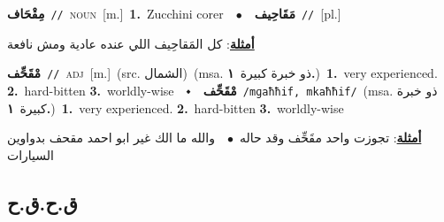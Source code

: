\documentclass[10pt,a4paper,twoside]{article} %
\begin{document}
\begin{multicols}{2}
{\setlength\topsep{0pt}\textbf{\foreignlanguage{arabic}{مِقْحَاف}}\ {\color{gray}\texttt{//}\color{black}}\ \textsc{noun}\ [m.]\ \textbf{1.}~Zucchini corer\ \ $\bullet$\ \ \setlength\topsep{0pt}\textbf{\foreignlanguage{arabic}{مَقَاحِيف}}\ {\color{gray}\texttt{//}\color{black}}\ [pl.]\  \begin{flushright}\color{gray}\foreignlanguage{arabic}{\textbf{\underline{\foreignlanguage{arabic}{أمثلة}}}: كل المَقاحِيف اللي عنده عادية ومش نافعة}\end{flushright}\color{black}} \vspace{2mm}

{\setlength\topsep{0pt}\textbf{\foreignlanguage{arabic}{مْقَحِّف}}\ {\color{gray}\texttt{//}\color{black}}\ \textsc{adj}\ [m.]\ (src. \color{gray}\foreignlanguage{arabic}{الشمال}\color{black})\ \color{gray}(msa. \foreignlanguage{arabic}{ذو خبرة كبيرة}~\foreignlanguage{arabic}{\textbf{١.}})\color{black}\ \textbf{1.}~very experienced.  \textbf{2.}~hard-bitten  \textbf{3.}~worldly-wise\ \ $\smblkdiamond$\ \ \setlength\topsep{0pt}\textbf{\foreignlanguage{arabic}{مْقَحِّف}}\ {\color{gray}\texttt{/mɡaħħif, mkaħħif/}\color{black}}\ \color{gray}(msa. \foreignlanguage{arabic}{ذو خبرة كبيرة}~\foreignlanguage{arabic}{\textbf{١.}})\color{black}\ \textbf{1.}~very experienced.  \textbf{2.}~hard-bitten  \textbf{3.}~worldly-wise\  \begin{flushright}\color{gray}\foreignlanguage{arabic}{\textbf{\underline{\foreignlanguage{arabic}{أمثلة}}}: تجوزت واحد مقَحِّف وقد حاله\ $\bullet$\ \  والله ما الك غير ابو احمد مقحف بدواوين السيارات}\end{flushright}\color{black}} \vspace{2mm}

\vspace{-3mm}
\subsection*{\color{blue}\foreignlanguage{arabic}{ق.ح.ق.ح}\color{blue}{}} 


\end{multicols}
\end{document}
